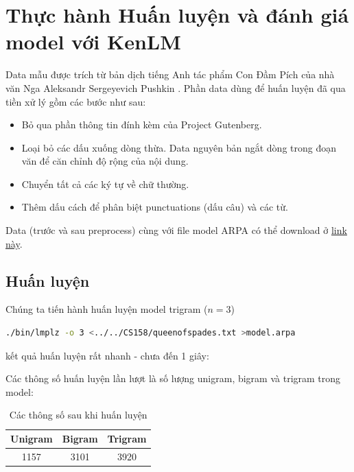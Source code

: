\documentclass[12pt]{article}
\begin{document}
\section{Thực hành Huấn luyện và đánh giá model với KenLM}
Data mẫu được trích từ bản dịch tiếng Anh tác phẩm Con Đầm Pích của nhà văn Nga Aleksandr Sergeyevich Pushkin \cite{queen-of-spades}. Phần data dùng để huấn luyện đã qua tiền xử lý gồm các bước như sau:
\begin{itemize}
\item Bỏ qua phần thông tin đính kèm của Project Gutenberg.
\item Loại bỏ các dấu xuống dòng thừa. Data nguyên bản ngắt dòng trong đoạn văn để căn chỉnh độ rộng của nội dung.
\item Chuyển tất cả các ký tự về chữ thường.
\item Thêm dấu cách để phân biệt punctuations (dấu câu) và các từ.
\end{itemize}
Data (trước và sau preprocess) cùng với file model ARPA có thể download ở \href{https://studenthcmusedu-my.sharepoint.com/:f:/g/personal/19120338_student_hcmus_edu_vn/EqFiWm6iywdKms6WFubsNOYBOzqfFttfH8P81jBT8gcZIw?e=truaMM}{link này}\label{download-model}.

\subsection{Huấn luyện}
Chúng ta tiến hành huấn luyện model trigram ($n = 3$)
\begin{lstlisting}[language=sh]
./bin/lmplz -o 3 <../../CS158/queenofspades.txt >model.arpa
\end{lstlisting}
kết quả huấn luyện rất nhanh - chưa đến 1 giây:
\begin{figure}[H]
\end{figure}
\noindent Các thông số huấn luyện lần lượt là số lượng unigram, bigram và trigram trong model:
\begin{table}[H]
\centering
\begin{tabular}{|c|c|c|}
    \hline
    Unigram & Bigram & Trigram \\
    \hline
    1157 & 3101 & 3920 \\
    \hline
\end{tabular}
\caption{Các thông số sau khi huấn luyện}
\end{table}
\end{document}
